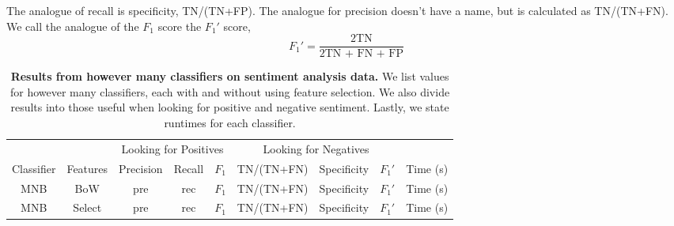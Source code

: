 \documentclass{article} %
\begin{document}
	The analogue of recall is specificity, TN/(TN+FP). The analogue for precision doesn't have a name, but is calculated as TN/(TN+FN). We call the analogue of the $F_1$ score the $F_1'$ score,
	\begin{equation}
	F_1' = \frac{\mbox{2TN}}{\mbox{2TN + FN + FP}}
	\end{equation}
	
	\begin{table}[h]
		\centering
		\begin{tabular}[]{@{}|c|c|c|c|c|c|c|c|c|@{}}
			\hline
			\multicolumn{2}{|c|}{} & \multicolumn{3}{c}{Looking for Positives} & \multicolumn{3}{c}{Looking for Negatives} &\\
			\cline{3-9}
			Classifier& Features& Precision& Recall& $F_1$& TN/(TN+FN)& Specificity & $F_1'$ & Time (s)\\
			\hline
			\hline
			MNB & BoW  & pre & rec & $F_1$& TN/(TN+FN)& Specificity & $F_1'$ & Time (s)\\
			MNB & Select & pre & rec & $F_1$& TN/(TN+FN)& Specificity & $F_1'$ & Time (s)\\
			\hline
		\end{tabular}
		\caption{{\bf Results from however many classifiers on sentiment analysis data.} We list values for however many classifiers, each with and without using feature selection. We also divide results into those useful when looking for positive and negative sentiment. Lastly, we state runtimes for each classifier.}
		\label{tab:results}
	\end{table}
\end{document}

